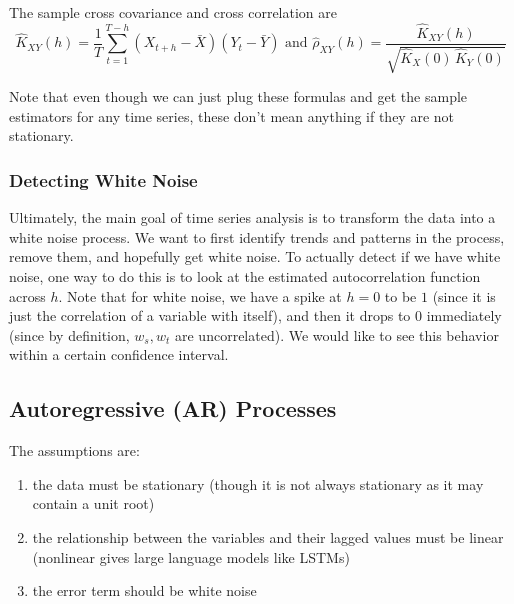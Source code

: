 \documentclass{article}
\begin{document}
    The sample cross covariance and cross correlation are 
    \begin{equation}
      \hat{K}_{XY} (h) = \frac{1}{T} \sum_{t=1}^{T-h} (X_{t+h} - \bar{X}) (Y_{t} - \bar{Y}) \text{ and } \hat{\rho}_{XY} (h) = \frac{\hat{K}_{XY}(h)}{\sqrt{\hat{K}_X (0) \, \hat{K}_Y (0)}}
    \end{equation}

    Note that even though we can just plug these formulas and get the sample estimators for any time series, these don't mean anything if they are not stationary. 

  \subsubsection{Detecting White Noise}

    Ultimately, the main goal of time series analysis is to transform the data into a white noise process. We want to first identify trends and patterns in the process, remove them, and hopefully get white noise. To actually detect if we have white noise, one way to do this is to look at the estimated autocorrelation function across $h$. Note that for white noise, we have a spike at $h = 0$ to be $1$ (since it is just the correlation of a variable with itself), and then it drops to $0$ immediately (since by definition, $w_s, w_t$ are uncorrelated). We would like to see this behavior within a certain confidence interval. 

\subsection{Autoregressive (AR) Processes}

  The assumptions are: 
  \begin{enumerate}
    \item the data must be stationary (though it is not always stationary as it may contain a unit root)
    \item the relationship between the variables and their lagged values must be linear (nonlinear gives large language models like LSTMs)
    \item the error term should be white noise
  \end{enumerate}
\end{document}
